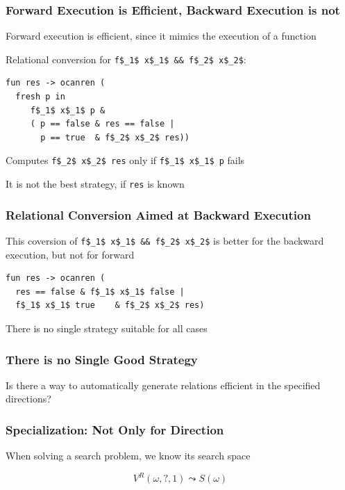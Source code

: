 \documentclass[xcolor=table]{beamer}
\begin{document}
\begin{frame}[fragile]
  \transwipe[direction=90]
  \frametitle{Forward Execution is Efficient, Backward Execution is not}

  Forward execution is efficient, since it mimics the execution of a function

\vspace{6pt}

Relational conversion for \lstinline{f$_1$ x$_1$ && f$_2$ x$_2$}:

\begin{lstlisting}
fun res -> ocanren (
  fresh p in
     f$_1$ x$_1$ p &
     ( p == false & res == false |
       p == true  & f$_2$ x$_2$ res))
\end{lstlisting}

Computes \lstinline{f$_2$ x$_2$ res} only if \lstinline{f$_1$ x$_1$ p} fails

\vspace{6pt}

It is not the best strategy, if \lstinline{res} is known

\end{frame}

\begin{frame}[fragile]
  \transwipe[direction=90]
  \frametitle{Relational Conversion Aimed at Backward Execution}

This coversion of  \lstinline{f$_1$ x$_1$ && f$_2$ x$_2$} is better for the backward execution, but not for forward

\begin{lstlisting}
fun res -> ocanren (
  res == false & f$_1$ x$_1$ false |
  f$_1$ x$_1$ true    & f$_2$ x$_2$ res)
\end{lstlisting}


  There is no single strategy suitable for all cases
\end{frame}

\begin{frame}[fragile]
  \transwipe[direction=90]
  \frametitle{There is no Single Good Strategy}

\begin{center}
Is there a way to automatically generate relations efficient in the specified directions?
\end{center}

\end{frame}


\begin{frame}[fragile]
  \transwipe[direction=90]
  \frametitle{Specialization: Not Only for Direction}
\begin{center} When solving a search problem, we know its search space  \end{center}

\[  V^R(\omega, ?, 1) \leadsto S(\omega) \]
\end{frame}
\end{document}
